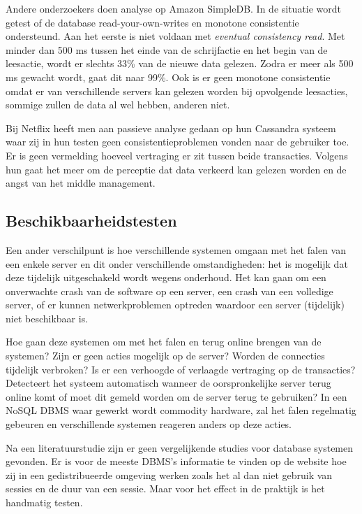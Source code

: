 Andere onderzoekers\cite{wada2011data} doen analyse op Amazon SimpleDB. In de situatie wordt getest of de database read-your-own-writes en monotone consistentie ondersteund. Aan het eerste is niet voldaan met \textit{eventual consistency read}. Met minder dan 500 ms tussen het einde van de schrijfactie en het begin van de leesactie, wordt er slechts 33\% van de nieuwe data gelezen. Zodra er meer als 500 ms gewacht wordt, gaat dit naar 99\%. Ook is er geen monotone consistentie omdat er van verschillende servers kan gelezen worden bij opvolgende leesacties, sommige zullen de data al wel hebben, anderen niet. 

Bij Netflix heeft men aan passieve analyse gedaan op hun Cassandra systeem \cite{kalantzisnetflix} waar zij in hun testen geen consistentieproblemen vonden naar de gebruiker toe. Er is geen vermelding hoeveel vertraging er zit tussen beide transacties. Volgens hun gaat het meer om de perceptie dat data verkeerd kan gelezen worden en de angst van het middle management. 

\subsection{Beschikbaarheidstesten}
Een ander verschilpunt is hoe verschillende systemen omgaan met het falen van een enkele server en dit onder verschillende omstandigheden: het is mogelijk dat deze tijdelijk uitgeschakeld wordt wegens onderhoud. Het kan gaan om een onverwachte crash van de software op een server, een crash van een volledige server, of er kunnen netwerkproblemen optreden waardoor een server (tijdelijk) niet beschikbaar is. 

Hoe gaan deze systemen om met het falen en terug online brengen van de systemen? Zijn er geen acties mogelijk op de server? Worden de connecties tijdelijk verbroken? Is er een verhoogde of verlaagde vertraging op de transacties? Detecteert het systeem automatisch wanneer de oorspronkelijke server terug online komt of moet dit gemeld worden om de server terug te gebruiken? In een NoSQL DBMS waar gewerkt wordt commodity hardware, zal het falen regelmatig gebeuren en verschillende systemen reageren anders op deze acties. 

Na een literatuurstudie zijn er geen vergelijkende studies voor database systemen gevonden. Er is voor de meeste DBMS's informatie te vinden op de website hoe zij in een gedistribueerde omgeving werken zoals het al dan niet gebruik van sessies en de duur van een sessie. Maar voor het effect in de praktijk is het handmatig testen. 

